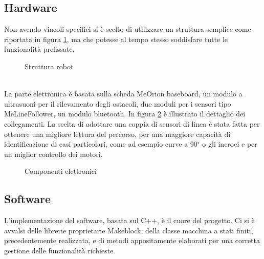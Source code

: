 \subsection{Hardware}
Non avendo vincoli specifici si è scelto di utilizzare un struttura semplice come riportata in figura \ref{struct}, ma che potesse al tempo stesso soddisfare tutte le funzionalità prefissate.%
\begin{figure}[h!t]
\centering
{}\quad
{}
\caption{Struttura robot}
\label{struct}
\end{figure}
\\La parte elettronica è basata sulla scheda MeOrion baseboard, un modulo a ultrasuoni per il rilevamento degli ostacoli, due moduli per i sensori tipo MeLineFollower, un modulo bluetooth. In figura \ref{schema} è illustrato il dettaglio dei collegamenti.
La scelta di adottare una coppia di sensori di linea è stata fatta per ottenere una migliore lettura del percorso, per una maggiore capacità di identificazione di casi particolari, come ad esempio curve a 90$^{\circ}$ o gli incroci e per un miglior controllo dei motori.
\begin{figure}[h]
	\quad
{}
\caption{Componenti elettronici}
\label{schema}
\end{figure}		
\subsection{Software}
L'implementazione del software, basata sul C++, è il cuore del progetto. Ci si è avvalsi delle librerie proprietarie Makeblock, della classe macchina a stati finiti, precedentemente realizzata, e di metodi appositamente elaborati per una corretta gestione delle funzionalità richieste.
